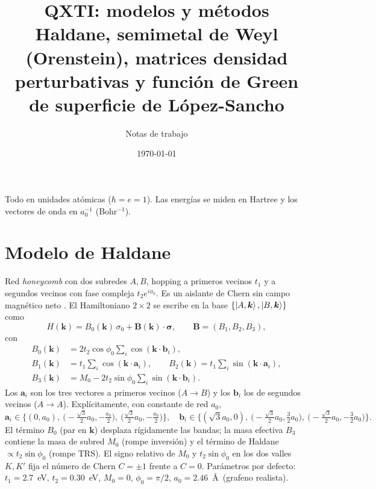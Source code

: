 \documentclass[11pt,a4paper]{article}
\title{QXTI: modelos y m\'etodos\\
\large Haldane, semimetal de Weyl (Orenstein), matrices densidad
perturbativas y funci\'on de Green de superficie de L\'opez-Sancho}
\author{Notas de trabajo}
\date{\today}
\newcommand{\kk}{\bm{k}}
\newcommand{\sig}{\bm{\sigma}}
\begin{document}
\maketitle

\noindent
Todo en unidades at\'omicas ($\hbar=e=1$). Las energ\'ias se miden en
Hartree y los vectores de onda en $a_0^{-1}$ (Bohr$^{-1}$).

\section{Modelo de Haldane}
Red \emph{honeycomb} con dos subredes $A,B$, hopping a primeros vecinos
$t_1$ y a segundos vecinos con fase compleja $t_2 e^{i\phi_0}$. Es un
aislante de Chern sin campo magn\'etico neto
\cite{Haldane1988}. El Hamiltoniano $2\times2$ se escribe en la base
$\{\ket{A,\kk},\ket{B,\kk}\}$ como
\begin{equation}
  H(\kk) = B_0(\kk)\,\sigma_0 + \bm{B}(\kk)\cdot\sig,
  \qquad
  \bm{B}=(B_1,B_2,B_3),
\end{equation}
con
\begin{align}
  B_0(\kk) &= 2 t_2\cos\phi_0 \sum_{i} \cos(\kk\cdot\bm{b}_i), \\
  B_1(\kk) &= t_1 \sum_{i}\cos(\kk\cdot\bm{a}_i), \qquad
  B_2(\kk) = t_1 \sum_{i}\sin(\kk\cdot\bm{a}_i), \\
  B_3(\kk) &= M_0 - 2 t_2\sin\phi_0 \sum_{i}\sin(\kk\cdot\bm{b}_i).
\end{align}
Los $\bm{a}_i$ son los tres vectores a primeros vecinos ($A\!\to\!B$) y
los $\bm{b}_i$ los de segundos vecinos ($A\!\to\!A$). Expl\'icitamente,
con constante de red $a_0$,
\begin{equation}
  \bm{a}_i \in \Big\{ (0,a_0),\ \big(\!-\tfrac{\sqrt3}{2}a_0,-\tfrac{a_0}{2}\big),\
  \big(\tfrac{\sqrt3}{2}a_0,-\tfrac{a_0}{2}\big)\Big\},
  \quad
  \bm{b}_i \in \Big\{ (\sqrt3 a_0,0),\ \big(\!-\tfrac{\sqrt3}{2}a_0,\tfrac{3}{2}a_0\big),\
  \big(\!-\tfrac{\sqrt3}{2}a_0,-\tfrac{3}{2}a_0\big)\Big\}.
\end{equation}
El t\'ermino $B_0$ (par en $\kk$) desplaza r\'igidamente las bandas; la
masa efectiva $B_3$ contiene la masa de subred $M_0$ (rompe inversi\'on)
y el t\'ermino de Haldane $\propto t_2\sin\phi_0$ (rompe TRS). El signo
relativo de $M_0$ y $t_2\sin\phi_0$ en los dos valles $K,K'$ fija el
n\'umero de Chern $C=\pm1$ frente a $C=0$. Par\'ametros por defecto:
$t_1=2.7$~eV, $t_2=0.30$~eV, $M_0=0$, $\phi_0=\pi/2$,
$a_0=2.46$~\AA\ (grafeno realista).
\end{document}
